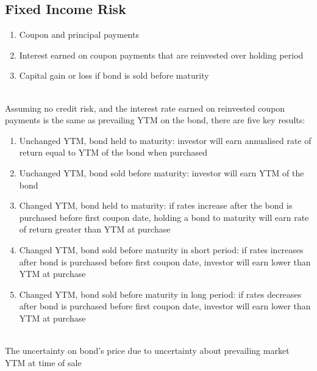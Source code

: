 \subsection{Fixed Income Risk}

\begin{remark} 
\begin{enumerate}[label=\roman*.]
\setlength{\itemsep}{0pt}
\item Coupon and principal payments
\item Interest earned on coupon payments that are reinvested over holding period
\item Capital gain or loss if bond is sold before maturity
\end{enumerate}
\end{remark}

\begin{remark} \\
Assuming no credit risk, and the interest rate earned on reinvested coupon payments is the same as prevailing YTM on the bond, there are five key results:
\begin{enumerate}[label=\roman*.]
\setlength{\itemsep}{0pt}
\item Unchanged YTM, bond held to maturity: investor will earn annualised rate of return equal to YTM of the bond when purchased
\item Unchanged YTM, bond sold before maturity: investor will earn YTM of the bond
\item Changed YTM, bond held to maturity: if rates increase after the bond is purchased before first coupon date, holding a bond to maturity will earn rate of return greater than YTM at purchase
\item Changed YTM, bond sold before maturity in short period: if rates increases after bond is purchased before first coupon date, investor will earn lower than YTM at purchase
\item Changed YTM, bond sold before maturity in long period: if rates decreases after bond is purchased before first coupon date, investor will earn lower than YTM at purchase
\end{enumerate}
\end{remark}

\begin{definition} \\
The uncertainty on bond's price due to uncertainty about prevailing market YTM at time of sale
\end{definition}

